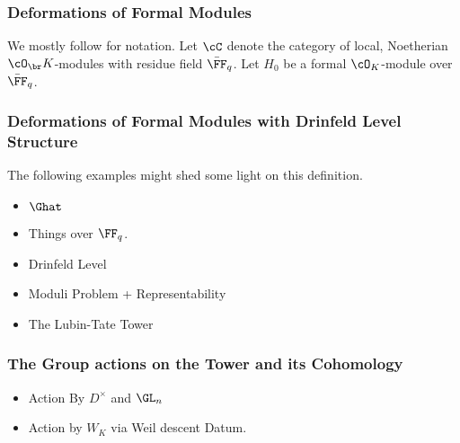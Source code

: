 \subsubsection{Deformations of Formal Modules} %
\label{subsub:Deformations of Formal Modules}
We mostly follow \cite[Chapter 2]{Strauch2008DefSp} for notation. Let $\cC$
denote the category of local, Noetherian $\cO_\br K$-modules with residue field
$\bar \FF_q$. Let $H_0$ be a formal $\cO_K$-module over $\bar \FF_q$. 


\subsubsection{Deformations of Formal Modules with Drinfeld Level Structure} 

\label{subsub:Deformations of Formal Modules with Drinfeld Level Structure}
The following examples might shed some light on this definition.
\begin{xpl}
  \begin{itemize}
    \item $\Ghat$
    \item Things over $\FF_q$.
  \end{itemize}
\end{xpl}

\begin{itemize}
  \item Drinfeld Level
  \item Moduli Problem + Representability
  \item The Lubin-Tate Tower
\end{itemize}

\subsubsection{The Group actions on the Tower and its Cohomology} %
\label{subsub:The Group actions on the Tower}
\begin{itemize}
  \item Action By $D^\times$ and $\GL_n$
  \item Action by $W_K$ via Weil descent Datum.
\end{itemize}
